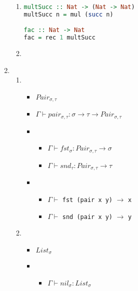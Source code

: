 \documentclass[12pt,a4paper]{article}
\begin{document}
\begin{enumerate}
{\begin{enumerate}
{\begin{lstlisting}[language=Haskell]
isZero :: Nat -> Bool -> Bool
isZero n _ = rec True false n

ge :: Nat -> Nat -> Bool
ge n m = rec True isZero (minus m n)
			\end{lstlisting}
		}
		\item {
			\begin{lstlisting}[language=Haskell]
multSucc :: Nat -> (Nat -> Nat)
multSucc n = mul (succ n)

fac :: Nat -> Nat
fac = rec 1 multSucc
			\end{lstlisting}
		}
		\item {
%
		}
	\end{enumerate}
}
\item {
	\begin{enumerate}
	\item {
		\begin{itemize}
			\item $Pair_{\sigma,\tau}$
			\item $\Gamma \vdash pair_{\sigma,\tau} \colon \sigma \rightarrow \tau \rightarrow Pair_{\sigma,\tau}$
			\item {
				\begin{itemize}
					\item $\Gamma \vdash fst_{\sigma} \colon Pair_{\sigma,\tau} \rightarrow \sigma$
					\item $\Gamma \vdash snd_{\tau} \colon Pair_{\sigma,\tau} \rightarrow \tau$
				\end{itemize}
			}
			\item {
				\begin{itemize}
					\item $\Gamma \vdash$ \texttt{fst (pair x y)} $\rightarrow$ \texttt{x}
					\item $\Gamma \vdash$ \texttt{snd (pair x y)} $\rightarrow$ \texttt{y}
				\end{itemize}
			}
		\end{itemize}
	}
	\item {
		\begin{itemize}
			\item $List_{\sigma}$
			\item {
				\begin{itemize}
					\item $\Gamma \vdash nil_{\sigma} \colon List_{\sigma}$

\end{itemize}}
\end{itemize}}
\end{enumerate}}
\end{enumerate}
\end{document}
